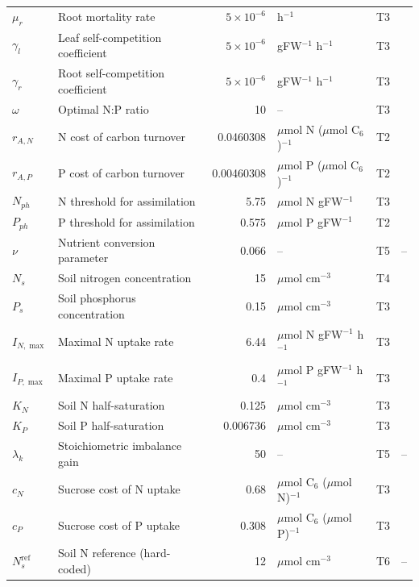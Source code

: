 \begin{table}[!htbp]
\begin{tabular}{@{}llrlll@{}}
$\mu_r$ & Root mortality rate & $5\times 10^{-6}$ & h$^{-1}$ & T3 & \citet{Tedone2020} \\
$\gamma_l$ & Leaf self-competition coefficient & $5\times 10^{-6}$ & gFW$^{-1}$ h$^{-1}$ & T3 & \citet{Tedone2020} \\
$\gamma_r$ & Root self-competition coefficient & $5\times 10^{-6}$ & gFW$^{-1}$ h$^{-1}$ & T3 & \citet{Tedone2020} \\
$\omega$ & Optimal N:P ratio & 10 & -- & T3 & \citet{Tedone2020} \\
$r_{A,N}$ & N cost of carbon turnover & 0.0460308 & $\mu$mol N ($\mu$mol C$_6$)$^{-1}$ & T2 & \citet{Tedone2020} \\
$r_{A,P}$ & P cost of carbon turnover & 0.00460308 & $\mu$mol P ($\mu$mol C$_6$)$^{-1}$ & T2 & \citet{Tedone2020} \\
$N_{ph}$ & N threshold for assimilation & 5.75 & $\mu$mol N gFW$^{-1}$ & T3 & \citet{Tedone2020} \\
$P_{ph}$ & P threshold for assimilation & 0.575 & $\mu$mol P gFW$^{-1}$ & T2 & \citet{Tedone2020} \\
$\nu$ & Nutrient conversion parameter & 0.066 & -- & T5 & -- \\
$N_s$ & Soil nitrogen concentration & 15 & $\mu$mol cm$^{-3}$ & T4 & \citet{Tedone2020} \\
$P_s$ & Soil phosphorus concentration & 0.15 & $\mu$mol cm$^{-3}$ & T3 & \citet{Tedone2020} \\
$I_{N,\max}$ & Maximal N uptake rate & 6.44 & $\mu$mol N gFW$^{-1}$ h$^{-1}$ & T3 & \citet{Tedone2020} \\
$I_{P,\max}$ & Maximal P uptake rate & 0.4 & $\mu$mol P gFW$^{-1}$ h$^{-1}$ & T3 & \citet{Tedone2020} \\
$K_N$ & Soil N half-saturation & 0.125 & $\mu$mol cm$^{-3}$ & T3 & \citet{Tedone2020} \\
$K_P$ & Soil P half-saturation & 0.006736 & $\mu$mol cm$^{-3}$ & T3 & \citet{Tedone2020} \\
$\lambda_k$ & Stoichiometric imbalance gain & 50 & -- & T5 & -- \\
$c_N$ & Sucrose cost of N uptake & 0.68 & $\mu$mol C$_6$ ($\mu$mol N)$^{-1}$ & T3 & \citet{Tedone2020} \\
$c_P$ & Sucrose cost of P uptake & 0.308 & $\mu$mol C$_6$ ($\mu$mol P)$^{-1}$ & T3 & \citet{Tedone2020} \\
$N_s^{\mathrm{ref}}$ & Soil N reference (hard-coded) & 12 & $\mu$mol cm$^{-3}$ & T6 & -- \\

\end{tabular}
\end{table}
